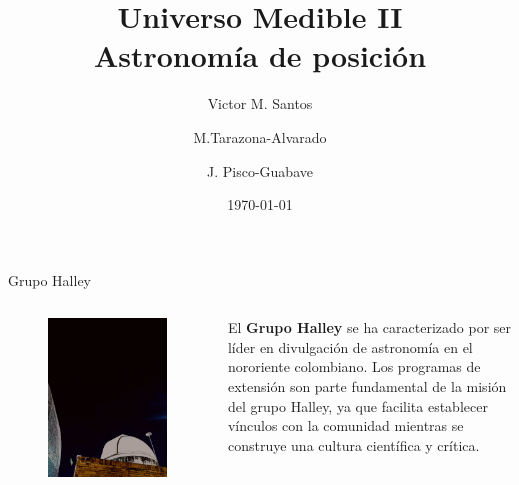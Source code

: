 \documentclass{beamer}
\title[Universo Medible II] 
{Universo Medible II \\ Astronomía de posición}
\author[Victor M. Santos] 
{Victor M. Santos \inst{} \and M.Tarazona-Alvarado \inst{} \and J. Pisco-Guabave \inst{}} %
\institute[]{
\inst{}Grupo Halley, Escuela de Física, Universidad Industrial de Santander, Bucaramanga, Colombia.}
\date{\today}
\begin{document}


\begin{frame}{Grupo Halley}
\titlepage %
\end{frame}


\begin{frame}
 \begin{columns}
  \begin{figure}
   \centering
   \includegraphics[scale=0.15]{Imagenes/Halley}
  \end{figure}
 \small
 \justify
  El \textbf{Grupo Halley} se ha caracterizado por ser líder en divulgación de astronomía en el nororiente colombiano. Los programas de extensión son parte fundamental de la misión del grupo Halley, ya que facilita establecer vínculos con la comunidad mientras se construye una cultura científica y crítica.
 \end{columns}
\end{frame}
\end{document}
